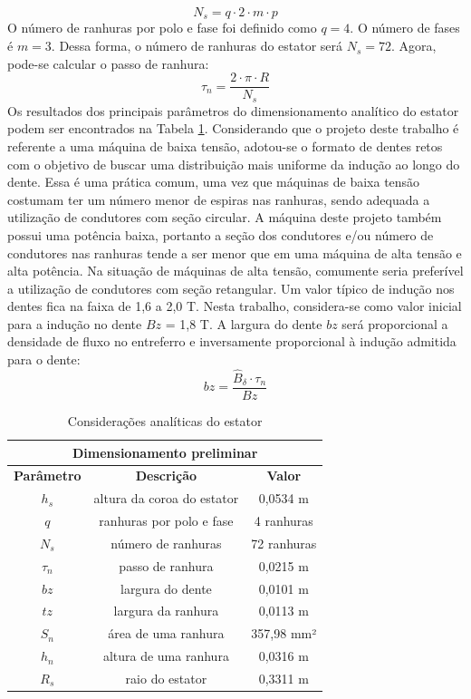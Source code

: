 \documentclass[conference]{IEEEtran}
\begin{document}
\begin{equation}
N_s = q \cdot 2 \cdot m \cdot p
\label{eq:N_s}
\end{equation}
O número de ranhuras por polo e fase foi definido como $ q = 4 $. O número de fases é $ m = 3 $. Dessa forma, o número de ranhuras do estator será $ N_s = 72 $.
Agora, pode-se calcular o passo de ranhura:
\begin{equation}
\tau_n =\frac{2\cdot \pi \cdot R}{N_s}
\label{eq:tau_n}
\end{equation}
Os resultados dos principais parâmetros do dimensionamento analítico do estator podem ser encontrados na Tabela \ref{tab:base_estator}.
Considerando que o projeto deste trabalho é referente a uma máquina de baixa tensão, adotou-se o formato de dentes retos com o objetivo de buscar uma distribuição
mais uniforme da indução ao longo do dente. Essa é uma prática comum, uma vez que máquinas de baixa tensão costumam ter um número menor de espiras nas ranhuras, sendo adequada a utilização de condutores com seção circular. A máquina deste projeto também possui uma potência baixa, portanto a seção dos condutores e/ou número de condutores nas ranhuras tende a ser menor que em uma máquina de alta tensão e alta potência. Na situação de máquinas de alta tensão, comumente seria preferível a utilização de condutores com seção retangular. Um valor típico de indução nos dentes fica na faixa de 1,6 a 2,0 T. Nesta trabalho, considera-se como valor inicial para a indução no dente $Bz$ = 1,8 T. A largura do dente $bz$ será proporcional a densidade de fluxo no entreferro e inversamente proporcional à indução admitida para o dente:
\begin{equation}
bz = \frac{\hat B_\delta \cdot \tau_n}{Bz}
\label{eq:bz}
\end{equation}

\begin{table}[t]
\centering
\caption{Considerações analíticas do estator}
\label{tab:base_estator}
\begin{tabular}{|c|c|c|}
\hline
\multicolumn{3}{|c|}{\textbf{Dimensionamento preliminar}} \\ \hline
\textbf{Parâmetro} & \textbf{Descrição} & \textbf{Valor} \\ \hline
$h_s$ & altura da coroa do estator & 0,0534 m \\ \hline
$q$ & ranhuras por polo e fase & 4 ranhuras \\ \hline
$N_s$ & número de ranhuras & 72 ranhuras \\ \hline
$ \tau_n $ & passo de ranhura & 0,0215 m \\ \hline
$ bz $ & largura do dente & 0,0101 m \\ \hline
$ tz $ & largura da ranhura & 0,0113 m \\ \hline
$ S_n $ & área de uma ranhura & 357,98 mm² \\ \hline
$ h_n $ & altura de uma ranhura & 0,0316 m \\ \hline
$ R_s $ & raio do estator & 0,3311 m\\ \hline
\end{tabular}
\end{table}
\end{document}
